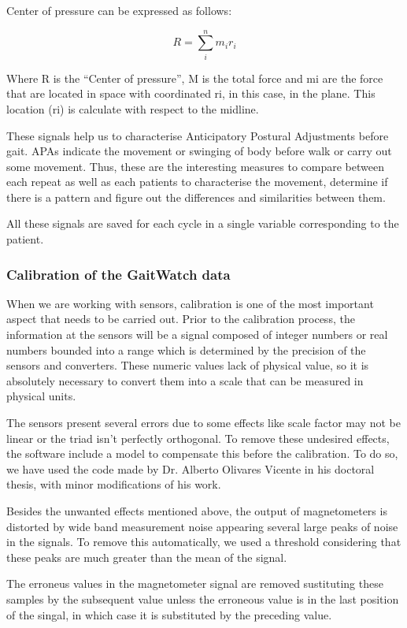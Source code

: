 Center of pressure can be expressed as follows:

\begin{equation}
	\label{COP}
	R=\sum_{i}^{n}m_{i}r_{i}
\end{equation}


Where R is the “Center of pressure”, M is the total force and mi are the force that are located in space with coordinated ri, in this case, in the plane. This location (ri) is calculate with respect to the midline.

These signals help us to characterise Anticipatory Postural Adjustments  before gait.  APAs indicate the movement or swinging of body before walk or carry out some movement. Thus, these are the interesting  measures to compare between each repeat as well as each patients to characterise the movement, determine if there is a pattern and figure out the differences and similarities between them.

All these signals are saved for each cycle in a single variable corresponding to the patient.


\subsubsection{Calibration of the GaitWatch data}
When we are working with sensors, calibration is one of the most important aspect that needs to be carried out. Prior to the calibration process,
the information at the sensors  will be a signal composed of integer
numbers  or real numbers bounded into a range which is determined by the precision of the sensors and converters. These numeric values lack of physical value, so it is absolutely necessary to convert them into a scale that can be measured in physical units.

The sensors present several errors due to some effects like scale factor may not be linear or the triad isn’t perfectly orthogonal. To remove these undesired effects, the software include a model to compensate this before the calibration. 
To do so, we have used the code made by Dr. Alberto Olivares Vicente in his doctoral thesis, with minor modifications of his work.

Besides the unwanted effects mentioned above, the output of magnetometers is distorted by wide band measurement noise appearing several large peaks of noise in the signals. To remove this automatically, we used a threshold considering that these peaks are much greater than the mean of the signal.


The erroneus values in the magnetometer signal are removed sustituting these samples by the subsequent value unless the erroneous value is in the last position of the singal, in which case it is substituted by the preceding value.

